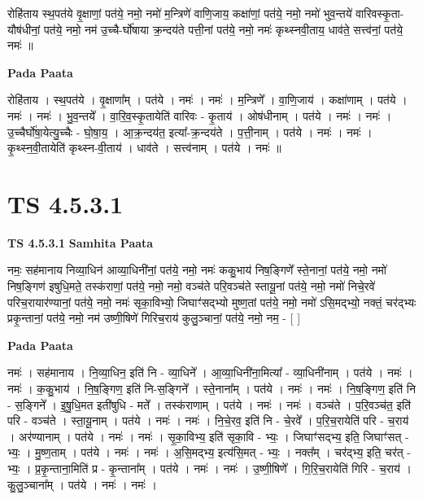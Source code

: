\documentclass[17pt]{extarticle}
\begin{document}
रोहि॑ताय स्थ॒पत॑ये वृ॒क्षाणां॒ पत॑ये॒ नमो॒                                      नमो॑ म॒न्त्रिणे॑ वाणि॒जाय॒ कक्षा॑णां॒ पत॑ये॒ नमो॒                          नमो॑ भुव॒न्तये॑ वारिवस्कृ॒ता-यौष॑धीनां॒ पत॑ये॒ नमो॒   नम॑ उ॒च्चै-र्घो॑षाया क्र॒न्दय॑ते पत्ती॒नां पत॑ये॒ नमो॒                    नमः॑ कृथ्स्नवी॒ताय॒ धाव॑ते॒ सत्त्व॑नां॒ पत॑ये॒ नमः॑ ॥ \newline

\textbf{Pada Paata} \newline

रोहि॑ताय । स्थ॒पत॑ये । वृ॒क्षाणा᳚म् । पत॑ये । नमः॑ । नमः॑ । म॒न्त्रिणे᳚ । वा॒णि॒जाय॑ । कक्षा॑णाम् । पत॑ये । नमः॑ । नमः॑ । भु॒व॒न्तये᳚ । वा॒रि॒व॒स्कृ॒तायेति॑ वारिवः - कृ॒ताय॑ । ओष॑धीनाम् । पत॑ये । नमः॑ । नमः॑ । उ॒च्चैर्घो॑षा॒येत्यु॒च्चैः - घो॒षा॒य॒ । आ॒क्र॒न्दय॑त॒ इत्या᳚-क्र॒न्दय॑ते । प॒त्ती॒नाम् । पत॑ये । नमः॑ । नमः॑ । कृ॒थ्स्न॒वी॒तायेति॑ कृथ्स्न-वी॒ताय॑ । धाव॑ते । सत्त्व॑नाम् । पत॑ये । नमः॑ ॥  \newline




\section*{ TS 4.5.3.1 }

\textbf{TS 4.5.3.1 } \newline
\textbf{Samhita Paata} \newline

नमः॒ सह॑मानाय निव्या॒धिन॑ आव्या॒धिनी॑नां॒ पत॑ये॒ नमो॒          नमः॑ ककु॒भाय॑ निष॒ङ्गिणे᳚ स्ते॒नानां॒ पत॑ये॒ नमो॒                       नमो॑ निष॒ङ्गिण॑ इषुधि॒मते॒ तस्क॑राणां॒ पत॑ये॒ नमो॒           नमो॒ वञ्च॑ते परि॒वञ्च॑ते स्तायू॒नां पत॑ये॒ नमो॒                                         नमो॑ निचे॒रवे॑ परिच॒रायार॑ण्यानां॒ पत॑ये॒ नमो॒                                   नमः॑ सृका॒विभ्यो॒ जिघाꣳ॑सद्भ्यो मुष्ण॒तां पत॑ये॒ नमो॒                   नमो॑ ऽसि॒मद्भ्यो॒ नक्तं॒ चर॑द्भ्यः प्रकृ॒न्तानां॒ पत॑ये॒ नमो॒ नम॑ उष्णी॒षिणे॑ गिरिच॒राय॑ कुलु॒ञ्चानां॒ पत॑ये॒ नमो॒ नम॒ - [  ] \newline

\textbf{Pada Paata} \newline

नमः॑ । सह॑मानाय । नि॒व्या॒धिन॒ इति॑ नि - व्या॒धिने᳚ । आ॒व्या॒धिनी॑ना॒मित्या᳚ - व्या॒धिनी॑नाम् । पत॑ये । नमः॑ । नमः॑ । क॒कु॒भाय॑ । नि॒ष॒ङ्गिण॒ इति॑ नि-स॒ङ्गिने᳚ । स्ते॒नाना᳚म् । पत॑ये । नमः॑ । नमः॑ । नि॒ष॒ङ्गिण॒ इति॑ नि - स॒ङ्गिने᳚ । इ॒षु॒धि॒मत इती॑षुधि - मते᳚ । तस्क॑राणाम् । पत॑ये । नमः॑ । नमः॑ । वञ्च॑ते । प॒रि॒वञ्च॑त॒ इति॑ परि - वञ्च॑ते । स्ता॒यू॒नाम् । पत॑ये । नमः॑ । नमः॑ । नि॒चे॒रव॒ इति॑ नि - चे॒रवे᳚ । प॒रि॒च॒रायेति॑ परि - च॒राय॑ । अर॑ण्यानाम् । पत॑ये । नमः॑ । नमः॑ । सृ॒का॒विभ्य॒ इति॑ सृका॒वि - भ्यः॒ । जिघाꣳ॑सद्भ्य॒ इति॒ जिघाꣳ॑सत् - भ्यः॒ । मु॒ष्ण॒ताम् । पत॑ये । नमः॑ । नमः॑ । अ॒सि॒मद्भ्य॒ इत्य॑सि॒मत् - भ्यः॒ । नक्त᳚म् । चर॑द्भ्य॒ इति॒ चर॑त् - भ्यः॒ । प्र॒कृ॒न्ताना॒मिति॑ प्र - कृ॒न्ताना᳚म् । पत॑ये । नमः॑ । नमः॑ । उ॒ष्णी॒षिणे᳚ । गि॒रि॒च॒रायेति॑ गिरि - च॒राय॑ । कु॒लु॒ञ्चाना᳚म् । पत॑ये । नमः॑ । नमः॑ ।  \newline
\end{document}
